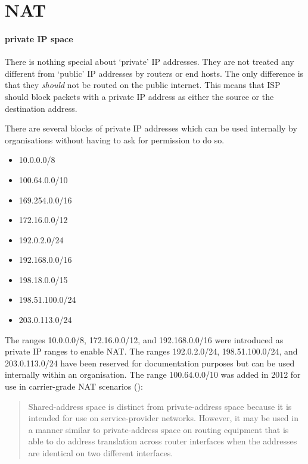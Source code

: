 \section{\Acl{NAT}}
\label{sec:ip-nat}


\paragraph{private \acs{IP} space}
There is nothing special about `private' \acs{IP} addresses.
They are not treated any different from `public' \acs{IP} addresses by routers or end hosts.
The only difference is that they \emph{should} not be routed on the public internet.
This means that \acl{ISP} should block packets with a private \acs{IP} address as either the source or the destination address.

There are several blocks of private \acs{IP} addresses which can be used internally by organisations without having to ask for permission to do so.
\begin{multicols}{2}
\raggedcolumns
\begin{itemize}
\item 10.0.0.0/8
\item 100.64.0.0/10
\item 169.254.0.0/16
\item 172.16.0.0/12
\item 192.0.2.0/24
\item 192.168.0.0/16
\item 198.18.0.0/15
\item 198.51.100.0/24
\item 203.0.113.0/24
\end{itemize}
\end{multicols}

The ranges 10.0.0.0/8, 172.16.0.0/12, and 192.168.0.0/16 were introduced as private IP ranges to enable \acf{NAT}.
The ranges 192.0.2.0/24, 198.51.100.0/24, and 203.0.113.0/24 have been reserved for documentation purposes but can be used internally within an organisation.
The range 100.64.0.0/10 was added in 2012 for use in carrier-grade \ac{NAT} scenarios ():

\begin{quote}
Shared-address space is distinct from  private-address space because it is intended for use on service-provider networks.
However, it may be used in a manner similar to  private-address space on routing equipment that is able to do address translation across router interfaces when the addresses are identical on two different interfaces.
\end{quote}

